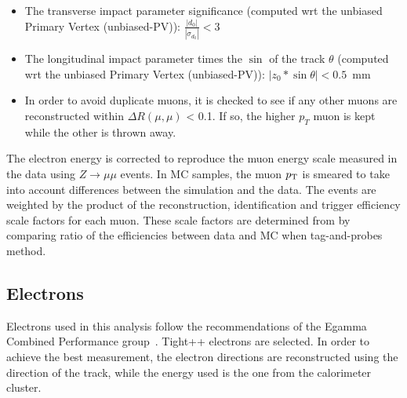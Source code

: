 \begin{itemize}
\item The transverse impact parameter significance (computed wrt the unbiased Primary Vertex (unbiased-PV)): $\displaystyle
  \frac{|d_{0}|}{|\sigma_{d_{0}}|}<3$
\item The longitudinal impact parameter times the $\sin$ of the track $\theta$ (computed wrt the unbiased Primary Vertex (unbiased-PV)): $\displaystyle
 |z_{0} * \sin{\theta}| < 0.5$~mm
\item In order to avoid duplicate muons, it is checked to see if any other muons are reconstructed within $\Delta R(\mu,\mu)$  < 0.1.  If so, the higher $p_{T}$ muon is kept while the other is thrown away.

\end{itemize}

The electron energy is corrected to reproduce the muon energy scale measured in the data using $Z\to{}\mu\mu$ events.
In MC samples, the muon $p_{\mathrm{T}}$ is smeared to take into account differences between the
simulation and the data. The events are weighted by the product of the reconstruction, identification and trigger efficiency scale factors for each muon. 
These scale factors are determined from by comparing ratio of the efficiencies between data and MC when tag-and-probes method.


\subsection{Electrons}
\label{sec:Object_selection_electrons}

Electrons used in this analysis follow the recommendations of the
Egamma Combined Performance group~\cite{Egamma}. Tight++ electrons are
selected. In order to achieve the best measurement, the electron directions are reconstructed using the
direction of the track, while the energy used is the one from the calorimeter cluster.  

